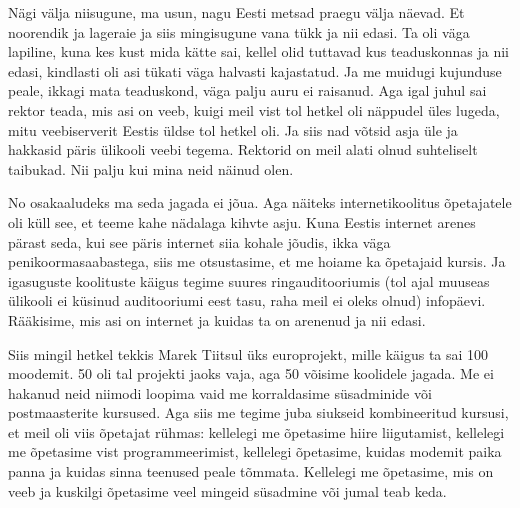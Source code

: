 
Nägi välja niisugune, ma usun, nagu Eesti metsad praegu välja näevad. Et noorendik ja lageraie ja siis mingisugune vana tükk ja nii edasi. Ta oli väga lapiline, kuna kes kust mida kätte sai, kellel olid tuttavad kus teaduskonnas ja nii edasi, kindlasti oli asi tükati väga halvasti kajastatud. Ja me  muidugi kujunduse peale, ikkagi mata teaduskond, väga palju auru ei raisanud. Aga igal juhul sai rektor teada, mis asi on veeb, kuigi meil vist tol hetkel oli näppudel üles lugeda, mitu veebiserverit Eestis üldse tol hetkel oli. Ja siis nad võtsid asja üle ja hakkasid päris ülikooli veebi tegema. Rektorid on meil alati olnud suhteliselt taibukad. Nii palju kui mina neid näinud olen. 


No osakaaludeks ma seda jagada ei jõua. Aga näiteks internetikoolitus õpetajatele oli küll see, et teeme kahe nädalaga kihvte asju. Kuna Eestis internet arenes pärast seda, kui see päris internet siia kohale jõudis,  ikka väga penikoormasaabastega, siis me otsustasime, et me hoiame ka õpetajaid kursis. Ja igasuguste koolituste käigus tegime  suures ringauditooriumis (tol ajal muuseas ülikooli ei küsinud auditooriumi eest tasu, raha meil ei oleks olnud) infopäevi. Rääkisime, mis asi on internet ja kuidas ta on arenenud ja nii edasi. 

Siis mingil hetkel tekkis Marek Tiitsul üks europrojekt, mille käigus ta sai 100 moodemit. 50 oli tal projekti jaoks vaja, aga 50 võisime koolidele jagada. Me ei hakanud neid niimodi loopima vaid me korraldasime süsadminide või postmaasterite kursused. Aga siis me tegime juba siukseid kombineeritud kursusi, et meil oli viis õpetajat rühmas: kellelegi me õpetasime hiire liigutamist, kellelegi me õpetasime vist  programmeerimist, kellelegi õpetasime, kuidas modemit paika panna ja kuidas sinna teenused peale tõmmata. Kellelegi me õpetasime, mis on veeb ja kuskilgi õpetasime veel mingeid süsadmine või jumal teab keda. 

